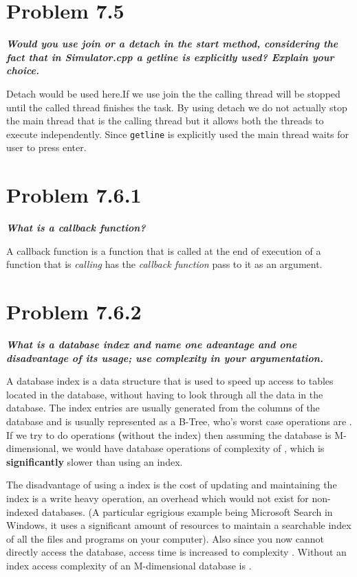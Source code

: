 \documentclass[a4paper,11pt]{article}
\theoremstyle{mytheor}
\begin{document}
\section*{Problem 7.5}

\textbf{\textit{Would you use join or a detach in the start method, considering
the fact that in Simulator.cpp a getline is explicitly used? Explain your
choice.}}

Detach would be used here.If we use join the the calling thread will be stopped
until the called thread finishes the task. By using detach we do not actually
stop the main thread that is the calling thread but it allows both the threads
to execute independently. Since \texttt{getline} is explicitly used the main
thread waits for user to press enter. 

\section*{Problem 7.6.1}
\textbf{\textit{What is a callback function?}}

A callback function is a function that is called at the end of execution of a
function that is \textit{calling} has the \textit{callback function} pass to it
as an argument.

\section*{Problem 7.6.2}
\textbf{\textit{What is a database index and name one advantage and one
disadvantage of its usage; use complexity in your argumentation.}}

A database index is a data structure that is used to speed up access to tables
located in the database, without having to look through all the data in the
database. The index entries are usually generated from the columns of the
database and is usually represented as a B-Tree, who's worst case operations are
. If we try to do operations \textbf(without the index) then
assuming the database is M-dimensional, we would have database operations of
complexity of , which is \textbf{significantly} slower than
using an index.

The disadvantage of using a index is the cost of updating and maintaining the
index is a write heavy operation, an overhead which would not exist for
non-indexed databases. (A particular egrigious example being Microsoft Search in
Windows, it uses a significant amount of resources to maintain a searchable
index of all the files and programs on your computer). Also since you now cannot
directly access the database, access time is increased to complexity
. Without an index access complexity of an M-dimensional
database is .
\end{document}
